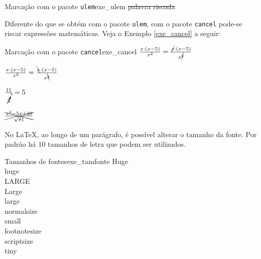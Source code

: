 \begin{texexptitled}[breakable,center lower,enhanced,middle=2mm,listing side text]{Marcação com o pacote \texttt{ulem}}{exe_ulem}
\sout{palavra riscada}
\end{texexptitled}

Diferente do que se obtém com o pacote {\tt ulem}, com o pacote {\tt cancel} pode-se riscar expressões matemáticas. Veja o Exemplo \ref{exe_cancel} a seguir:

\begin{texexptitled}[breakable,center lower,enhanced,middle=2mm,]{Marcação com o pacote \texttt{cancel}}{exe_cancel}
$\frac{x \cdot (x - 5)}{x^{2}} = \frac{\cancel{x} 
\cdot (x - 5)}{x^{\cancel{2}}}$

$\frac{x \cdot (x - 5)}{x^{2}} = \frac{\bcancel{x} 
\cdot (x - 5)}{x^{\bcancel{2}}}$

$\frac{15}{\cancelto{5}{3}} = 5$

$\xcancel{\frac{x^{2} - 5x + 10}{\sqrt{81}}}$
\end{texexptitled}

No \LaTeX{}, ao longo de um parágrafo, é possível alterar o tamanho da fonte. Por padrão há 10 tamanhos de letra que podem ser utilizados.

\begin{texexptitled}[breakable,center lower,enhanced,middle=2mm,listing side text]{Tamanhos de fontes}{exe_tamfonte}
{\Huge Huge} \\
{\huge huge} \\
{\LARGE LARGE} \\
{\Large Large} \\
{\large large} \\
{\normalsize normalsize} \\
{\small small} \\
{\footnotesize footnotesize} \\
{\scriptsize scriptsize} \\
{\tiny tiny}
\end{texexptitled}

